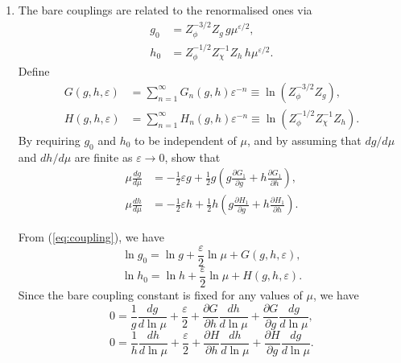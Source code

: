 \begin{enumerate}[label=\alph*)]
    \item The bare couplings are related to the renormalised ones via
    \begin{align}
        g_0 &= Z_\phi^{-3/2}Z_g\, g\mu^{\varepsilon/2},\\
        h_0 &= Z_\phi^{-1/2}Z_\chi^{-1}Z_h\, h\mu^{\varepsilon/2}.
        \label{eq:coupling}
    \end{align}
    Define
    \begin{align}
        G(g,h,\varepsilon) &= \sum_{n=1}^\infty G_n(g,h)\varepsilon^{-n} \equiv \ln(Z_\phi^{-3/2}Z_g),\\
        H(g,h,\varepsilon) &= \sum_{n=1}^\infty H_n(g,h)\varepsilon^{-n} \equiv \ln(Z_\phi^{-1/2}Z_\chi^{-1}Z_h).
    \end{align}
    By requiring $g_0$ and $h_0$ to be independent of $\mu$, and by assuming that $dg/d\mu$ and $dh/d\mu$ are finite as $\varepsilon\to 0$, show that
    \begin{align}
        \mu\frac{dg}{d\mu} &= -\tfrac{1}{2}\varepsilon g + \tfrac{1}{2}g\!\left(g\frac{\partial G_1}{\partial g}+h\frac{\partial G_1}{\partial h}\right),\\
        \mu\frac{dh}{d\mu} &= -\tfrac{1}{2}\varepsilon h + \tfrac{1}{2}h\!\left(g\frac{\partial H_1}{\partial g}+h\frac{\partial H_1}{\partial h}\right).
    \end{align}
    \begin{solution}
        From (\ref{eq:coupling}), we have
        \begin{equation}
            \ln g_0 = \ln g + \frac{\varepsilon}{2}\ln\mu + G(g,h,\varepsilon),
        \end{equation}
        \begin{equation}
            \ln h_0 = \ln h + \frac{\varepsilon}{2}\ln\mu + H(g,h,\varepsilon).
        \end{equation}
        Since the bare coupling constant is fixed for any values of $\mu$, we have
        \begin{equation}
            0 = \frac{1}{g}\frac{dg}{d\ln\mu} + \frac{\varepsilon}{2} + \frac{\partial G}{\partial h}\frac{dh}{d\ln\mu} + \frac{\partial G}{\partial g}\frac{dg}{d\ln\mu},
        \end{equation}
        \begin{equation}
            0 = \frac{1}{h}\frac{dh}{d\ln\mu} + \frac{\varepsilon}{2} + \frac{\partial H}{\partial h}\frac{dh}{d\ln\mu} + \frac{\partial H}{\partial g}\frac{dg}{d\ln\mu}.
        \end{equation}

\end{solution}
\end{enumerate}
